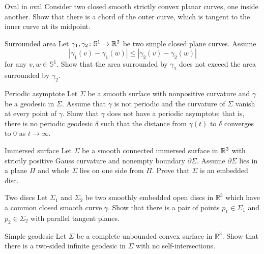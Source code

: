 \documentclass[twoside]{book}
\begin{document}
\begin{pr}{}{Oval in oval}\label{Oval in oval} %
Consider two closed smooth strictly convex planar curves, one inside another. 
Show that there is a chord of the outer curve, which is tangent to the inner curve at its midpoint.
\end{pr}

\begin{pr}{\easy}{Surrounded area}\label{Surrounded area}
Let $\gamma_1,\gamma_2\colon\mathbb S^1\to\mathbb{R}^2$ be two simple closed plane curves.
Assume 
\[|\gamma_1(v)-\gamma_1(w)|\le|\gamma_2(v)-\gamma_2(w)|\]
for any $v,w\in \mathbb S^1$.
Show that the area surrounded by $\gamma_1$ does not exceed the area surrounded by $\gamma_2$. 
\end{pr}

\begin{pr}{}{Periodic asymptote}\label{Asymptotic geodesic}
Let $\Sigma$ be a smooth surface with nonpositive curvature
and $\gamma$ be a geodesic in $\Sigma$.
Assume that $\gamma$ is not periodic
and the curvature of $\Sigma$ vanish at every point of $\gamma$.
Show that $\gamma$ does not have a periodic asymptote;
that is, there is no periodic geodesic $\delta$ such that the distance from $\gamma(t)$ to $\delta$  converges to $0$ as $t\to\infty$. 
\end{pr}

\begin{pr}{}{Immersed surface}\label{Immersed surface}
Let $\Sigma$ be a smooth connected immersed surface in $\mathbb{R}^3$ with strictly positive Gauss curvature and nonempty boundary $\partial\Sigma$.
Assume $\partial\Sigma$ lies in a plane $\Pi$
and whole $\Sigma$ lies on one side from $\Pi$.
Prove that $\Sigma$ is an embedded disc.
\end{pr}

\begin{pr}{}{Two discs}\label{Two discs}
Let $\Sigma_1$ and $\Sigma_2$ be two smoothly embedded open discs in $\mathbb R^3$ 
which have a common closed smooth curve $\gamma$.
Show that there is a pair of points  $p_1\in \Sigma_1$ and $p_2\in \Sigma_2$ with parallel tangent planes.
\end{pr}

\begin{pr}{}{Simple geodesic}\label{Simple geodesic}
Let $\Sigma$ be a complete unbounded convex surface in $\mathbb R^3$.
Show that there is a two-sided infinite geodesic in $\Sigma$ with no self-intersections.
\end{pr}
\end{document}
